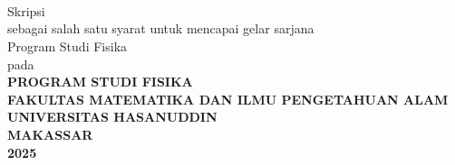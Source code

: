\begingroup
\singlespacing
\fontsize{11pt}{13pt}\selectfont
\begin{center}
  \textbf{\JudulSkripsi} \\
  \vfill
  \MakeTextUppercase{\NamaPenulis} \\
  \NIM \\
  \vfill
  \begingroup
  \fontsize{10pt}{13pt}\selectfont
  Skripsi \\
  \vspace*{1cm}
  sebagai salah satu syarat untuk mencapai gelar sarjana \\
  \endgroup
  \vspace*{1cm}
  Program Studi Fisika \\
  \vfill
  pada \\
  \vfill
  \textbf{PROGRAM STUDI FISIKA} \\
  \textbf{FAKULTAS MATEMATIKA DAN ILMU PENGETAHUAN ALAM} \\
  \textbf{UNIVERSITAS HASANUDDIN} \\
  \textbf{MAKASSAR} \\
  \textbf{2025}
\end{center}
\endgroup
\restoregeometry
